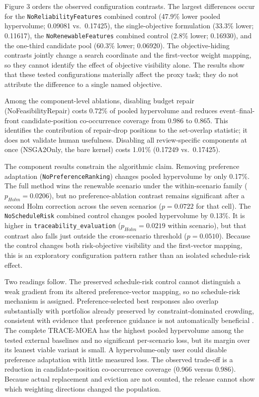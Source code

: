 \documentclass[energies,article,submit,moreauthors]{Definitions/mdpi}
\begin{document}
Figure 3 orders the observed configuration contrasts. The largest differences occur for the \texttt{NoReliabilityFeatures} combined control (47.9\% lower pooled hypervolume; 0.09081 vs.~0.17425), the single-objective formulation (33.3\% lower; 0.11617), the \texttt{NoRenewableFeatures} combined control (2.8\% lower; 0.16930), and the one-third candidate pool (60.3\% lower; 0.06920). The objective-hiding contrasts jointly change a search coordinate and the first-vector weight mapping, so they cannot identify the effect of objective visibility alone. The results show that these tested configurations materially affect the proxy task; they do not attribute the difference to a single named objective.

Among the component-level ablations, disabling budget repair (NoFeasibilityRepair) costs 0.72\% of pooled hypervolume and reduces event--final-front candidate-position co-occurrence coverage from 0.986 to 0.865. This identifies the contribution of repair-drop positions to the set-overlap statistic; it does not validate human usefulness. Disabling all review-specific components at once (NSGA2Only, the bare kernel) costs 1.01\% (0.17249 vs.~0.17425).

The component results constrain the algorithmic claim. Removing preference adaptation (\texttt{NoPreferenceRanking}) changes pooled hypervolume by only 0.17\%. The full method wins the renewable scenario under the within-scenario family (\(p_{Holm}=0.0206\)), but no preference-ablation contrast remains significant after a second Holm correction across the seven scenarios (\(p=0.0722\) for that cell). The \texttt{NoScheduleRisk} combined control changes pooled hypervolume by 0.13\%. It is higher in \texttt{traceability\_evaluation} (\(p_{Holm}=0.0219\) within scenario), but that contrast also falls just outside the cross-scenario threshold (\(p=0.0510\)). Because the control changes both risk-objective visibility and the first-vector mapping, this is an exploratory configuration pattern rather than an isolated schedule-risk effect.

Two readings follow. The preserved schedule-risk control cannot distinguish a weak gradient from its altered preference-vector mapping, so no schedule-risk mechanism is assigned. Preference-selected best responses also overlap substantially with portfolios already preserved by constraint-dominated crowding, consistent with evidence that preference guidance is not automatically beneficial \cite{ref20}. The complete TRACE-MOEA has the highest pooled hypervolume among the tested external baselines and no significant per-scenario loss, but its margin over its leanest viable variant is small. A hypervolume-only user could disable preference adaptation with little measured loss. The observed trade-off is a reduction in candidate-position co-occurrence coverage (0.966 versus 0.986). Because actual replacement and eviction are not counted, the release cannot show which weighting directions changed the population.
\end{document}

